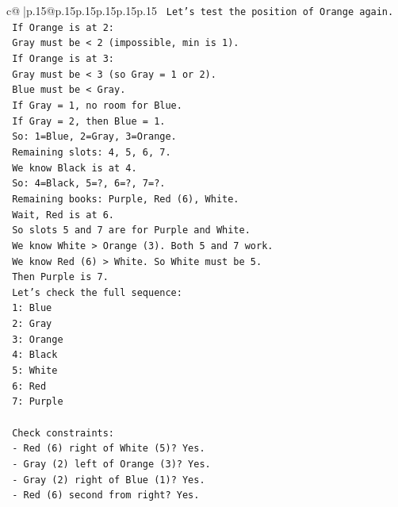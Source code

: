 \documentclass{article}
\begin{document}
{\begin{supertabular}{c@{$\;$}|p{.15\linewidth}@{}p{.15\linewidth}p{.15\linewidth}p{.15\linewidth}p{.15\linewidth}p{.15\linewidth}}
{{{\texttt{    Let's test the position of Orange again.} \\
\texttt{    If Orange is at 2:} \\
\texttt{       Gray must be < 2 (impossible, min is 1).} \\
\texttt{    If Orange is at 3:} \\
\texttt{       Gray must be < 3 (so Gray = 1 or 2).} \\
\texttt{       Blue must be < Gray.} \\
\texttt{       If Gray = 1, no room for Blue.} \\
\texttt{       If Gray = 2, then Blue = 1.} \\
\texttt{       So: 1=Blue, 2=Gray, 3=Orange.} \\
\texttt{       Remaining slots: 4, 5, 6, 7.} \\
\texttt{       We know Black is at 4.} \\
\texttt{       So: 4=Black, 5=?, 6=?, 7=?.} \\
\texttt{       Remaining books: Purple, Red (6), White.} \\
\texttt{       Wait, Red is at 6.} \\
\texttt{       So slots 5 and 7 are for Purple and White.} \\
\texttt{       We know White > Orange (3). Both 5 and 7 work.} \\
\texttt{       We know Red (6) > White. So White must be 5.} \\
\texttt{       Then Purple is 7.} \\
\texttt{       Let's check the full sequence:} \\
\texttt{       1: Blue} \\
\texttt{       2: Gray} \\
\texttt{       3: Orange} \\
\texttt{       4: Black} \\
\texttt{       5: White} \\
\texttt{       6: Red} \\
\texttt{       7: Purple} \\
\\ 
\texttt{       Check constraints:} \\
\texttt{       {-} Red (6) right of White (5)? Yes.} \\
\texttt{       {-} Gray (2) left of Orange (3)? Yes.} \\
\texttt{       {-} Gray (2) right of Blue (1)? Yes.} \\
\texttt{       {-} Red (6) second from right? Yes.} \\
}}}
\end{supertabular}}
\end{document}
